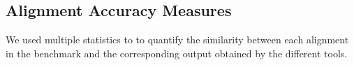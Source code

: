 \documentclass[12pt,letterpaper]{article}
\begin{document}



\subsection*{Alignment Accuracy Measures}

We used multiple statistics to to quantify the similarity between each alignment in the benchmark and the corresponding output obtained by the different tools.
\end{document}
